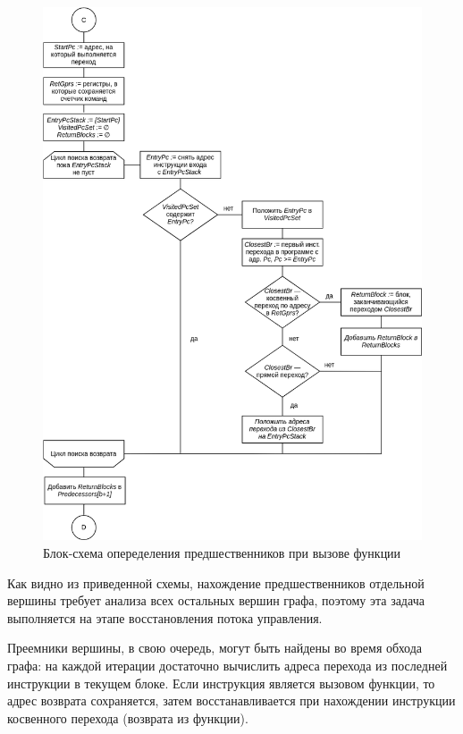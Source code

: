 \documentclass[a4paper,14pt]{extarticle}
\begin{document}
{\begin{figure}[H]
\centering
\includegraphics[width=\textwidth]{diagrams/alg-cfg-call}
\caption{Блок-схема опеределения предшественников при вызове функции}
\label{fig:diagram-cfg-call}
\end{figure}

Как видно из приведенной схемы, нахождение предшественников отдельной вершины
требует анализа всех остальных вершин графа, поэтому эта задача выполняется
на этапе восстановления потока управления.

Преемники вершины, в свою очередь, могут быть найдены во время обхода графа:
на каждой итерации достаточно вычислить адреса перехода из последней инструкции в текущем блоке.
Если инструкция является вызовом функции, то адрес возврата сохраняется, затем восстанавливается
при нахождении инструкции косвенного перехода (возврата из функции).

}
\end{document}

